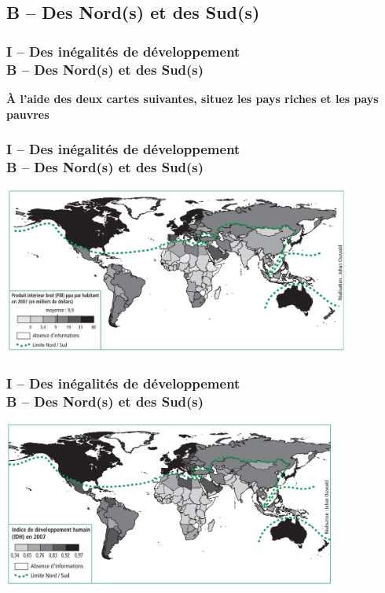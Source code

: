 \documentclass[C]{beamer}
\begin{document}
	\subsection*{B -- Des Nord(s) et des Sud(s)}
	\begin{frame}
	\frametitle{I -- Des inégalités de développement\\ B -- Des Nord(s) et des Sud(s)}
	\begin{center}
	\textbf{\`A l'aide des deux cartes suivantes, situez les pays riches et les pays pauvres}
	\end{center}
	\end{frame}
	
	\begin{frame}
	\frametitle{I -- Des inégalités de développement\\ B -- Des Nord(s) et des Sud(s)}
	\begin{center}
	\includegraphics[height=5.5cm]{images/carte_1_01.jpg}
	\end{center}
	\end{frame}
	
	\begin{frame}
	\frametitle{I -- Des inégalités de développement\\ B -- Des Nord(s) et des Sud(s)}
	\begin{center}
	\includegraphics[height=5.5cm]{images/carte_1_02.jpg}
	\end{center}
	\end{frame}
	
\end{document}
